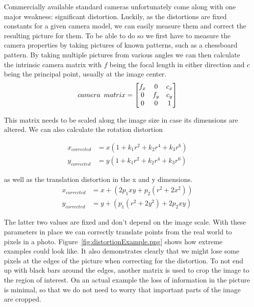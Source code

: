 Commercially available standard cameras unfortunately come along with one major weakness: significant distortion.
Luckily, as the distortions are fixed constants for a given camera model, we can easily measure them and correct the resulting picture for them.
To be able to do so we first have to measure the camera properties by taking pictures of known patterns, such as a chessboard pattern.
By taking multiple pictures from various angles we can then calculate the intrinsic camera matrix with $f$ being the focal length in either direction and $c$ being the principal point, usually at the image center.
\[
    camera \hspace{5px}matrix =
    \begin{bmatrix}
        f_{x} & 0 & c_{x} \\
        0 & f_{y} & c_{y} \\
        0 & 0 & 1
    \end{bmatrix}
\]

This matrix needs to be scaled along the image size in case its dimensions are altered.
We can also calculate the rotation distortion

\begin{align*}
    x_{corrected} &= x(1 + k_{1}r^{2} + k_{2}r^{4} + k_{3}r^{6}) \\
    y_{corrected} &= y(1 + k_{1}r^{2} + k_{2}r^{4} + k_{3}r^{6})
\end{align*}

as well as the translation distortion in the x and y dimensions.
\begin{align*}
    x_{corrected} &= x + (2p_{1}xy + p_{2}(r^{2} + 2x^{2})) \\
    y_{corrected} &= y + (p_{1} (r^{2} + 2y^{2}) + 2p_{2}xy)
\end{align*}

The latter two values are fixed and don't depend on the image scale.
With these parameters in place we can correctly translate points from the real world to pixels in a photo.
Figure~\ref{fig:distortionExample.png} shows how extreme examples could look like.
It also demonstrates clearly that we might lose some pixels at the edges of the picture when correcting for the distortion.
To not end up with black bars around the edges, another matrix is used to crop the image to the region of interest.
On an actual example the loss of information in the picture is minimal, so that we do not need to worry that important parts of the image are cropped.


